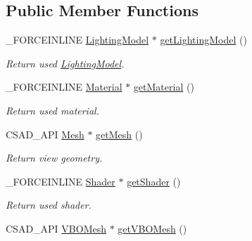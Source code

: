 \subsection*{Public Member Functions}
\begin{DoxyCompactItemize}
\item 
\hypertarget{classcsad_1_1_mesh_filter_ab2ab22b032aa9cfa7d67a26d61ae3a5c}{\-\_\-\-F\-O\-R\-C\-E\-I\-N\-L\-I\-N\-E \hyperlink{classcsad_1_1_lighting_model}{Lighting\-Model} $\ast$ \hyperlink{classcsad_1_1_mesh_filter_ab2ab22b032aa9cfa7d67a26d61ae3a5c}{get\-Lighting\-Model} ()}\label{classcsad_1_1_mesh_filter_ab2ab22b032aa9cfa7d67a26d61ae3a5c}

\begin{DoxyCompactList}\small\item\em Return used \hyperlink{classcsad_1_1_lighting_model}{Lighting\-Model}. \end{DoxyCompactList}\item 
\hypertarget{classcsad_1_1_mesh_filter_a6c416735a6272930e9d8534d17d444ee}{\-\_\-\-F\-O\-R\-C\-E\-I\-N\-L\-I\-N\-E \hyperlink{classcsad_1_1_material}{Material} $\ast$ \hyperlink{classcsad_1_1_mesh_filter_a6c416735a6272930e9d8534d17d444ee}{get\-Material} ()}\label{classcsad_1_1_mesh_filter_a6c416735a6272930e9d8534d17d444ee}

\begin{DoxyCompactList}\small\item\em Return used material. \end{DoxyCompactList}\item 
\hypertarget{classcsad_1_1_mesh_filter_a566d03045466a6d9b800de1764575b6f}{C\-S\-A\-D\-\_\-\-A\-P\-I \hyperlink{classcsad_1_1_mesh}{Mesh} $\ast$ \hyperlink{classcsad_1_1_mesh_filter_a566d03045466a6d9b800de1764575b6f}{get\-Mesh} ()}\label{classcsad_1_1_mesh_filter_a566d03045466a6d9b800de1764575b6f}

\begin{DoxyCompactList}\small\item\em Return view geometry. \end{DoxyCompactList}\item 
\hypertarget{classcsad_1_1_mesh_filter_a947c5f3197434a7c9e918958e5085912}{\-\_\-\-F\-O\-R\-C\-E\-I\-N\-L\-I\-N\-E \hyperlink{classcsad_1_1_shader}{Shader} $\ast$ \hyperlink{classcsad_1_1_mesh_filter_a947c5f3197434a7c9e918958e5085912}{get\-Shader} ()}\label{classcsad_1_1_mesh_filter_a947c5f3197434a7c9e918958e5085912}

\begin{DoxyCompactList}\small\item\em Return used shader. \end{DoxyCompactList}\item 
\hypertarget{classcsad_1_1_mesh_filter_a0bbe27e608bc97c12b3ad6ab2002f8d2}{C\-S\-A\-D\-\_\-\-A\-P\-I \hyperlink{classcsad_1_1_v_b_o_mesh}{V\-B\-O\-Mesh} $\ast$ \hyperlink{classcsad_1_1_mesh_filter_a0bbe27e608bc97c12b3ad6ab2002f8d2}{get\-V\-B\-O\-Mesh} ()}\label{classcsad_1_1_mesh_filter_a0bbe27e608bc97c12b3ad6ab2002f8d2}


\end{DoxyCompactItemize}
